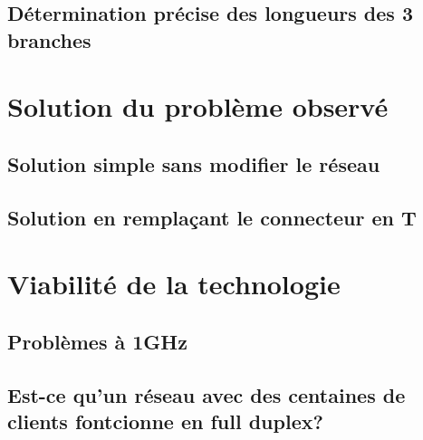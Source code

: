 \documentclass[DIV=15,paper=letter,titlepage=true,fontsize=12pt,headings=normal,captions=nooneline]{scrartcl}
\begin{document}
\subsection{Détermination précise des longueurs des 3 branches}

\FloatBarrier


\section{Solution du problème observé}
\subsection{Solution simple sans modifier le réseau}

\FloatBarrier
\subsection{Solution en remplaçant le connecteur en T}

\FloatBarrier


\section{Viabilité de la technologie}
\subsection{Problèmes à 1GHz}

\FloatBarrier
\subsection{Est-ce qu'un réseau avec des centaines de clients fontcionne en full duplex?}

\FloatBarrier
\end{document}
